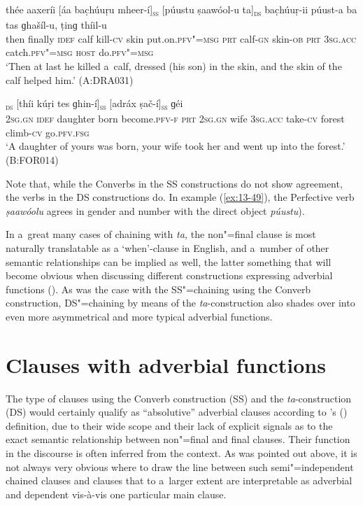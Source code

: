 \begin{exe}
\ex
\label{ex:13-49}
\gll thée aaxeríi [áa bac̣húuṛu mheer-í]\textsc{\textsubscript{ss}} [púustu ṣaawóol-u ta]\textsc{\textsubscript{ds}} bac̣húuṛ-ii púust-a ba tas ɡhašíl-u, ṭinɡ thíil-u \\
then finally \textsc{idef} calf kill-\textsc{cv}  skin  put.on.\textsc{pfv"=msg} \textsc{prt} calf-\textsc{gn} skin-\textsc{ob} \textsc{prt} \textsc{3sg.acc}
catch.\textsc{pfv"=msg} \textsc{host} do.\textsc{pfv"=msg} \\
\glt `Then at last he killed a~calf, dressed (his son) in the skin, and the skin of the calf helped him.' (A:DRA031)

\ex
\label{ex:13-50}
\textsc{\textsubscript{ds}} [thíi kúṛi tes ɡhin-í]\textsc{\textsubscript{ss}} [adráx ṣač-í]\textsc{\textsubscript{ss}} ɡéi \\
\textsc{2sg.gn} \textsc{idef} daughter born become.\textsc{pfv-f} \textsc{prt} \textsc{2sg.gn}  wife \textsc{3sg.acc} take-\textsc{cv} forest climb-\textsc{cv} go.\textsc{pfv.fsg} \\
\glt `A daughter of yours was born, your wife took her and went up into the forest.' (B:FOR014) 
\end{exe}

Note that, while the Converbs in the SS constructions do not show agreement, the verbs in the DS constructions do. In example (\ref{ex:13-49}), the Perfective verb \textit{ṣaawóolu} agrees in gender and number with the direct object \textit{púustu}). 


In a~great many cases of chaining with \textit{ta,} the non"=final clause is most naturally translatable as a `when'-clause in English, and a~number of other semantic relationships can be implied as well, the latter something that will become obvious when discussing different constructions expressing adverbial functions (). As was the case with the SS"=chaining using the Converb construction, DS"=chaining by means of the \textit{ta}-construction also shades over into even more asymmetrical and more typical adverbial functions. 


\section{Clauses with adverbial functions}
\label{sec:13-4}

The type of clauses using the Converb construction (SS) and the \textit{ta}-construction (DS) would certainly qualify as ``absolutive'' adverbial clauses according to \citeauthor{thompsonetal2007}'s (\citeyear[264--266]{thompsonetal2007}) definition, due to their wide scope and their lack of explicit signals as to the exact semantic relationship between non"=final and final clauses. Their function in the discourse is often inferred from the context. As was pointed out above, it is not always very obvious where to draw the line between such semi"=independent chained clauses and clauses that to a~larger extent are interpretable as adverbial and dependent vis-à-vis one particular main clause. 



